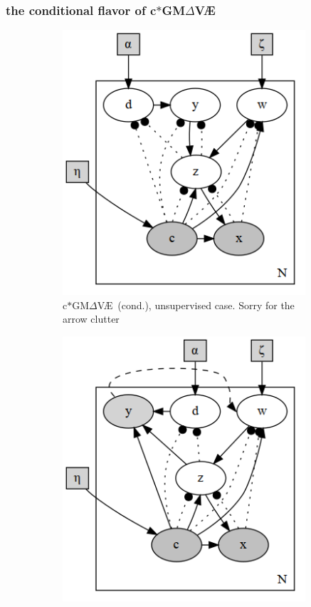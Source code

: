 \documentclass[final]{beamer}
\theoremstyle{plain}
\theoremstyle{definition}
\theoremstyle{remark}
\newcommand{\gmvae}{c$\ast$GM$\Delta$V\AE~}
\begin{document}
\begin{frame}
\frametitle{the conditional flavor of \gmvae}
\begin{figure}[h]
\centering
\begin{subfigure}[b]{0.45\textwidth}
\includegraphics[width=0.99\textwidth]{plots/dirichlet_gmm_cvae.v2.gv.png}
\caption{\gmvae (cond.), unsupervised case. Sorry for the arrow clutter}
\label{fig:dirgmmcvae}
\end{subfigure}
\begin{subfigure}[b]{0.45\textwidth}
\includegraphics[width=0.99\textwidth]{plots/dirichlet_gmm_cvae_supervised.v2.gv.png}

\end{subfigure}
\end{figure}
\end{frame}
\end{document}
